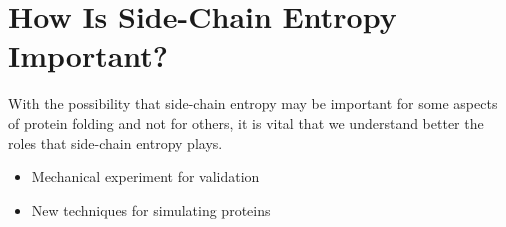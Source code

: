 \section*{How Is Side-Chain Entropy Important?}
\label{sec:how_is_side_chain_entropy_important_}
With the possibility that side-chain entropy may be important for some aspects of protein folding and not for others, it is vital that we understand better the roles that side-chain entropy plays.
\begin{itemize}
	\item Mechanical experiment for validation
	\item New techniques for simulating proteins
\end{itemize}